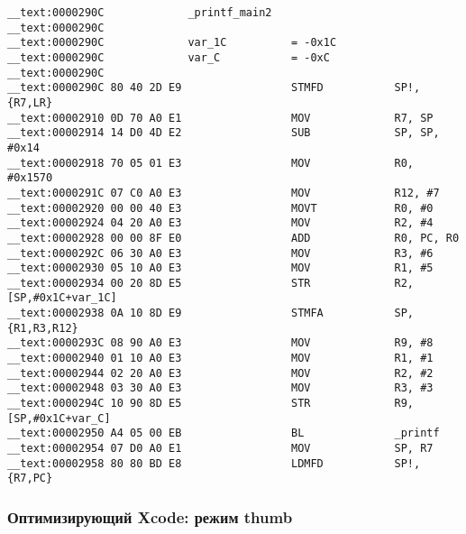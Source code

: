 \begin{lstlisting}
__text:0000290C             _printf_main2
__text:0000290C
__text:0000290C             var_1C          = -0x1C
__text:0000290C             var_C           = -0xC
__text:0000290C
__text:0000290C 80 40 2D E9                 STMFD           SP!, {R7,LR}
__text:00002910 0D 70 A0 E1                 MOV             R7, SP
__text:00002914 14 D0 4D E2                 SUB             SP, SP, #0x14
__text:00002918 70 05 01 E3                 MOV             R0, #0x1570
__text:0000291C 07 C0 A0 E3                 MOV             R12, #7
__text:00002920 00 00 40 E3                 MOVT            R0, #0
__text:00002924 04 20 A0 E3                 MOV             R2, #4
__text:00002928 00 00 8F E0                 ADD             R0, PC, R0
__text:0000292C 06 30 A0 E3                 MOV             R3, #6
__text:00002930 05 10 A0 E3                 MOV             R1, #5
__text:00002934 00 20 8D E5                 STR             R2, [SP,#0x1C+var_1C]
__text:00002938 0A 10 8D E9                 STMFA           SP, {R1,R3,R12}
__text:0000293C 08 90 A0 E3                 MOV             R9, #8
__text:00002940 01 10 A0 E3                 MOV             R1, #1
__text:00002944 02 20 A0 E3                 MOV             R2, #2
__text:00002948 03 30 A0 E3                 MOV             R3, #3
__text:0000294C 10 90 8D E5                 STR             R9, [SP,#0x1C+var_C]
__text:00002950 A4 05 00 EB                 BL              _printf
__text:00002954 07 D0 A0 E1                 MOV             SP, R7
__text:00002958 80 80 BD E8                 LDMFD           SP!, {R7,PC}
\end{lstlisting}

\subsubsection{Оптимизирующий Xcode: режим thumb}

